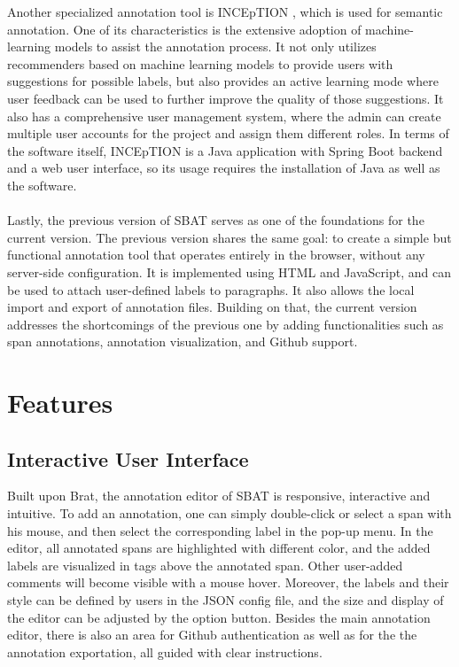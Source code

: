 \documentclass[12ptm a4paper]{article}
\begin{document}
Another specialized annotation tool is INCEpTION \cite{klie-etal-2018-inception}, which is used for semantic annotation. One of its characteristics is the extensive adoption of machine-learning models to assist the annotation process. It not only utilizes recommenders based on machine learning models to provide users with suggestions for possible labels, but also provides an active learning mode where user feedback can be used to further improve the quality of those suggestions. It also has a comprehensive user management system, where the admin can create multiple user accounts for the project and assign them different roles. In terms of the software itself, INCEpTION is a Java application with Spring Boot backend and a web user interface, so its usage requires the installation of Java as well as the software.\\
\\
Lastly, the previous version of SBAT \cite{SBAT} serves as one of the foundations for the current version. The previous version shares the same goal: to create a simple but functional annotation tool that operates entirely in the browser, without any server-side configuration. It is implemented using HTML and JavaScript, and can be used to attach user-defined labels to paragraphs. It also allows the local import and export of annotation files. Building on that, the current version addresses the shortcomings of the previous one by adding functionalities such as span annotations, annotation visualization, and Github support.
\section{Features}
\subsection{Interactive User Interface}
Built upon Brat, the annotation editor of SBAT is responsive, interactive and intuitive. To add an annotation, one can simply double-click or select a span with his mouse, and then select the corresponding label in the pop-up menu. In the editor, all annotated spans are highlighted with different color, and the added labels are visualized in tags above the annotated span. Other user-added comments will become visible with a mouse hover. Moreover, the labels and their style can be defined by users in the JSON config file, and the size and display of the editor can be adjusted by the option button. Besides the main annotation editor, there is also an area for Github authentication as well as for the the annotation exportation, all guided with clear instructions.
\end{document}

